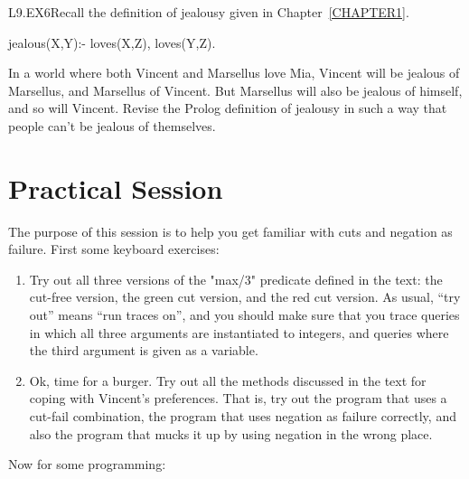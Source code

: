 \begin{LPNexercise}{L9.EX6}Recall the definition of jealousy given in Chapter~\ref{CHAPTER1}.
\begin{LPNcodedisplay}
jealous(X,Y):- loves(X,Z), loves(Y,Z).
\end{LPNcodedisplay}
In a world where both Vincent and Marsellus love Mia, Vincent will be
jealous of Marsellus, and Marsellus of Vincent. But Marsellus will
also be jealous of himself, and so will Vincent.  Revise the Prolog
definition of jealousy in such a way that people can't be jealous
of themselves.
\end{LPNexercise}




\section{Practical Session}\label{SEC.L10.PRAXIS}



The purpose of this session is to help you get familiar with cuts and
negation as failure.
First some keyboard exercises:

\begin{enumerate}
\item{}Try out all three versions of the
"max/3" predicate defined in the text: the cut-free
version, the green cut version, and the red cut version.  As usual,
``try out'' means ``run traces on'', and you should make sure that you
trace queries in which all three arguments are instantiated
to integers, and queries where the third argument is given as a
variable.
\item{}Ok, time for a burger. Try out all the methods discussed in the
text for coping with Vincent's preferences. That is, try out the
program that uses a cut-fail combination, the program that uses
negation as failure correctly, and also the program that mucks it up
by using negation in the wrong place.
\end{enumerate}


Now for some programming:

